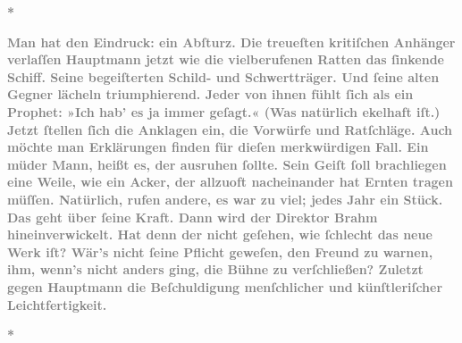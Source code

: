\pstart
           \centering{}\textcolor{gray}{\textbf{*}}\pend
           
\pstart
           \textcolor{gray}{\textbf{Man hat den Eindruck: ein Abſturz. Die treueſten kritiſchen
                  Anhänger verlaſſen Hauptmann jetzt wie die
                  vielberufenen Ratten das{ }ſinkende Schiff. Seine begeiſterten Schild- und
                  Schwertträger. Und{ }ſeine alten Gegner lächeln triumphierend. Jeder von ihnen fühlt{ }ſich als ein Prophet: »Ich hab’ es ja immer geſagt.« (Was natürlich ekelhaft iſt.)
                  Jetzt{ }ſtellen{ }ſich die Anklagen ein, die Vorwürfe und Ratſchläge. Auch möchte man
                  Erklärungen finden für dieſen merkwürdigen Fall. Ein müder Mann, heißt es, der
                  ausruhen{ }ſollte. Sein Geiſt{ }ſoll brachliegen eine Weile, wie ein Acker, der
                  allzuoft nacheinander hat Ernten tragen müſſen. Natürlich, rufen andere, es war zu
                  viel; jedes Jahr ein Stück. Das geht über{ }ſeine Kraft. Dann wird der Direktor Brahm hineinverwickelt. Hat denn der nicht
                  geſehen, wie{ }ſchlecht das neue Werk iſt? Wär’s nicht{ }ſeine Pflicht geweſen, den Freund zu warnen, ihm, wenn’s nicht
                  anders ging, die Bühne zu
                  verſchließen? Zuletzt gegen Hauptmann die
                  Beſchuldigung menſchlicher und künſtleriſcher Leichtfertigkeit.}}\pend
           
\pstart
           \centering{}\textcolor{gray}{\textbf{*}}\pend
           
